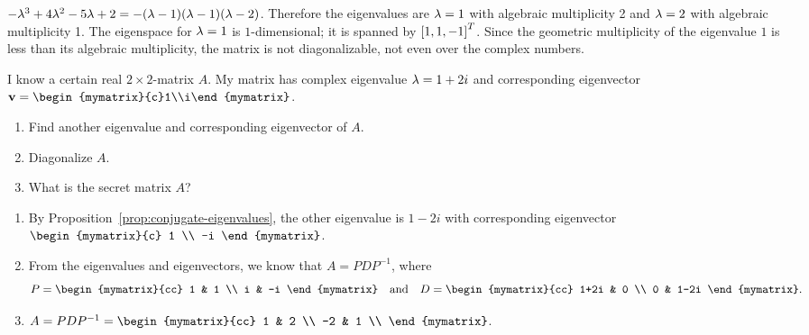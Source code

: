 \begin{ex}
\begin{sol}
\begin{enumerate}
      $-\lambda^3+4\lambda^2-5\lambda+2 =
      -(\lambda-1)(\lambda-1)(\lambda-2)$. Therefore the
      eigenvalues are $\lambda=1$ with algebraic multiplicity 2 and
      $\lambda=2$ with algebraic multiplicity 1. The eigenspace for
      $\lambda=1$ is $1$-dimensional; it is spanned by
      $\left[1,1,-1\right]^T$. Since the geometric multiplicity of the
      eigenvalue $1$ is less than its algebraic multiplicity, the
      matrix is not diagonalizable, not even over the complex numbers.
    \end{enumerate}
  \end{sol}
\end{ex}

\begin{ex}
  I know a certain real $2\times 2$-matrix $A$. My matrix has complex
  eigenvalue $\lambda=1+2i$ and corresponding eigenvector
  $\vect{v}=\begin{mymatrix}{c}1\\i\end{mymatrix}$.
  \begin{enumerate}
  \item Find another eigenvalue and corresponding eigenvector of $A$.
  \item Diagonalize $A$.
  \item What is the secret matrix $A$?
  \end{enumerate}

  \begin{sol}
    \begin{enumerate}
    \item By Proposition~\ref{prop:conjugate-eigenvalues}, the other
      eigenvalue is $1-2i$ with corresponding eigenvector
      $\begin{mymatrix}{c} 1 \\ -i \end{mymatrix}$.
    \item From the eigenvalues and eigenvectors, we know that
      $A=PDP^{-1}$, where
      \begin{equation*}
        P = \begin{mymatrix}{cc}
          1 & 1 \\
          i & -i
        \end{mymatrix}
        \quad\mbox{and}\quad
        D = \begin{mymatrix}{cc}
          1+2i & 0 \\
          0 & 1-2i
        \end{mymatrix}.
      \end{equation*}
    \item $A = PDP^{-1} = \begin{mymatrix}{cc}
        1 & 2 \\
        -2 & 1 \\
      \end{mymatrix}$.
    \end{enumerate}
  \end{sol}
\end{ex}

